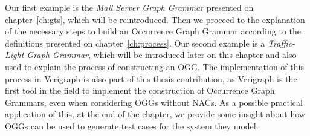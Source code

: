 
Our first example is the \emph{Mail Server Graph Grammar} presented on chapter~\ref{ch:gts}, which will be reintroduced. Then we proceed to the explanation of the necessary steps to build an Occurrence Graph Grammar according to the definitions presented on chapter~\ref{ch:process}. Our second example is a \emph{Traffic-Light Graph Grammar}, which will be introduced later on this chapter and also used to explain the process of constructing an OGG. The implementation of this process in Verigraph is also part of this thesis contribution, as Verigraph is the first tool in the field to implement the construction of Occurrence Graph Grammars, even when considering OGGs without NACs. As a possible practical application of this, at the end of the chapter, we provide some insight about how OGGs can be used to generate test cases for the system they model.



